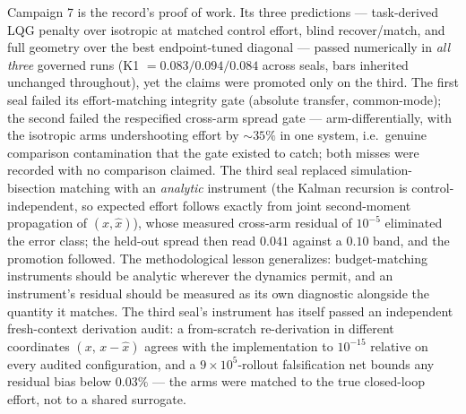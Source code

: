 \documentclass[letterpaper,onecolumn]{IEEEtran}
\theoremstyle{definition}
\theoremstyle{remark}
\begin{document}
Campaign 7 is the record's proof of work. Its three predictions ---
task-derived LQG penalty over isotropic at matched control effort,
blind recover/match, and full geometry over the best endpoint-tuned
diagonal --- passed numerically in \emph{all three} governed runs
(K1 $= 0.083/0.094/0.084$ across seals, bars inherited unchanged
throughout), yet the claims were promoted only on the third. The first
seal failed its effort-matching integrity gate (absolute transfer,
common-mode); the second failed the respecified cross-arm spread gate ---
arm-differentially, with the isotropic arms undershooting effort by
${\sim}35\%$ in one system, i.e.\ genuine comparison contamination that
the gate existed to catch; both misses were recorded with no comparison
claimed. The third seal replaced simulation-bisection matching with an
\emph{analytic} instrument (the Kalman recursion is control-independent,
so expected effort follows exactly from joint second-moment propagation of
$(x,\hat x)$), whose measured cross-arm residual of $10^{-5}$ eliminated
the error class; the held-out spread then read $0.041$ against a $0.10$
band, and the promotion followed. The methodological lesson generalizes:
budget-matching instruments should be analytic wherever the dynamics
permit, and an instrument's residual should be measured as its own
diagnostic alongside the quantity it matches. The third seal's instrument
has itself passed an independent fresh-context derivation audit: a
from-scratch re-derivation in different coordinates $(x,\,x-\hat x)$
agrees with the implementation to $10^{-15}$ relative on every audited
configuration, and a $9\times10^{5}$-rollout falsification net bounds any
residual bias below $0.03\%$ --- the arms were matched to the true
closed-loop effort, not to a shared surrogate.
\end{document}
